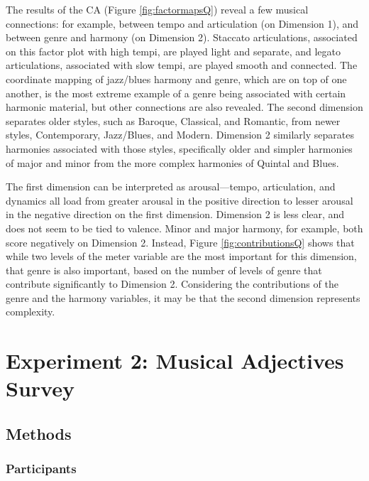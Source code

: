 \documentclass[
  english,
  man]{apa6}
\begin{document}
The results of the CA (Figure \ref{fig:factormapsQ}) reveal a few musical connections: for example, between tempo and articulation (on Dimension 1), and between genre and harmony (on Dimension 2). Staccato articulations, associated on this factor plot with high tempi, are played light and separate, and legato articulations, associated with slow tempi, are played smooth and connected. The coordinate mapping of jazz/blues harmony and genre, which are on top of one another, is the most extreme example of a genre being associated with certain harmonic material, but other connections are also revealed. The second dimension separates older styles, such as Baroque, Classical, and Romantic, from newer styles, Contemporary, Jazz/Blues, and Modern. Dimension 2 similarly separates harmonies associated with those styles, specifically older and simpler harmonies of major and minor from the more complex harmonies of Quintal and Blues.

The first dimension can be interpreted as arousal---tempo, articulation, and dynamics all load from greater arousal in the positive direction to lesser arousal in the negative direction on the first dimension. Dimension 2 is less clear, and does not seem to be tied to valence. Minor and major harmony, for example, both score negatively on Dimension 2. Instead, Figure \ref{fig:contributionsQ} shows that while two levels of the meter variable are the most important for this dimension, that genre is also important, based on the number of levels of genre that contribute significantly to Dimension 2. Considering the contributions of the genre and the harmony variables, it may be that the second dimension represents complexity.

\hypertarget{experiment-2-musical-adjectives-survey}{%
\section{Experiment 2: Musical Adjectives Survey}\label{experiment-2-musical-adjectives-survey}}

\hypertarget{methods-1}{%
\subsection{Methods}\label{methods-1}}

\hypertarget{participants-2}{%
\subsubsection{Participants}\label{participants-2}}
\end{document}
